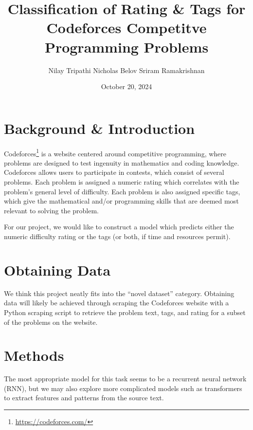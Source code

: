 \documentclass{article}
\title{Classification of Rating \& Tags for Codeforces Competitve Programming Problems}
\author{Nilay Tripathi \hspace{\authorspace} Nicholas Belov \hspace{\authorspace} Sriram Ramakrishnan}
\date{October 20, 2024}
\begin{document}
		\maketitle

		\section{Background \& Introduction}
		Codeforces\footnote{\href{https://codeforces.com}{https://codeforces.com/}} is a website centered around competitive programming, where problems are designed to test ingenuity in mathematics and coding knowledge. Codeforces allows users to participate in contests, which consist of several problems. Each problem is assigned a numeric rating which correlates with the problem's general level of difficulty. Each problem is also assigned specific tags, which give the mathematical and/or programming skills that are deemed most relevant to solving the problem. \par 

		For our project, we would like to construct a model which predicts either the numeric difficulty rating or the tags (or both, if time and resources permit). 

		\section{Obtaining Data}
		We think this project neatly fits into the ``novel dataset'' category. Obtaining data will likely be achieved through scraping the Codeforces website with a Python scraping script to retrieve the problem text, tags, and rating for a subset of the problems on the website. 

		\section{Methods}
		The most appropriate model for this task seems to be a recurrent neural network (RNN), but we may also explore more complicated models such as transformers to extract features and patterns from the source text.
\end{document}
